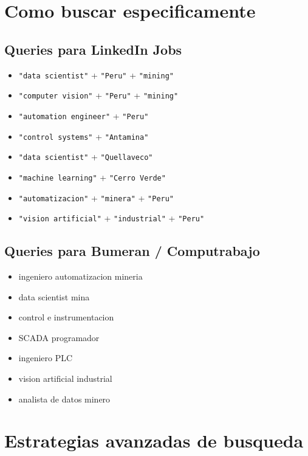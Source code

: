 \documentclass[11pt,a4paper,oneside]{report}
\begin{document}
\section{Como buscar especificamente}

\subsection{Queries para LinkedIn Jobs}

\begin{itemize}[leftmargin=2em]
  \item \texttt{"data scientist"} + \texttt{"Peru"} + \texttt{"mining"}
  \item \texttt{"computer vision"} + \texttt{"Peru"} + \texttt{"mining"}
  \item \texttt{"automation engineer"} + \texttt{"Peru"}
  \item \texttt{"control systems"} + \texttt{"Antamina"}
  \item \texttt{"data scientist"} + \texttt{"Quellaveco"}
  \item \texttt{"machine learning"} + \texttt{"Cerro Verde"}
  \item \texttt{"automatizacion"} + \texttt{"minera"} + \texttt{"Peru"}
  \item \texttt{"vision artificial"} + \texttt{"industrial"} + \texttt{"Peru"}
\end{itemize}

\subsection{Queries para Bumeran / Computrabajo}

\begin{itemize}[leftmargin=2em]
  \item ingeniero automatizacion mineria
  \item data scientist mina
  \item control e instrumentacion
  \item SCADA programador
  \item ingeniero PLC
  \item vision artificial industrial
  \item analista de datos minero
\end{itemize}

\section{Estrategias avanzadas de busqueda}
\end{document}
